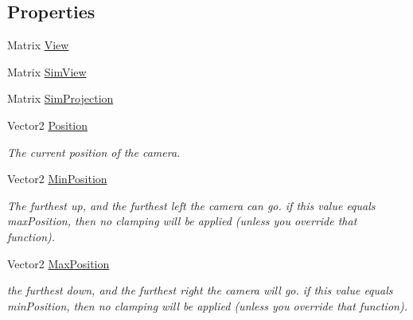 \subsection*{Properties}
\begin{DoxyCompactItemize}
\item 
Matrix \hyperlink{classgearit_1_1xna_1_1_camera2_d_ab2fbc971de185e14e0675169c2067cf4}{View}
\item 
Matrix \hyperlink{classgearit_1_1xna_1_1_camera2_d_a26119c8c8951ad9e7a64b47f211b1e32}{Sim\+View}
\item 
Matrix \hyperlink{classgearit_1_1xna_1_1_camera2_d_a09dac4561fd789c364d243776fde4921}{Sim\+Projection}
\item 
Vector2 \hyperlink{classgearit_1_1xna_1_1_camera2_d_a521385c0e06f30380cf90da21d2807b2}{Position}
\begin{DoxyCompactList}\small\item\em The current position of the camera. \end{DoxyCompactList}\item 
Vector2 \hyperlink{classgearit_1_1xna_1_1_camera2_d_aef67974a5b726a05b395b372099fcdc9}{Min\+Position}
\begin{DoxyCompactList}\small\item\em The furthest up, and the furthest left the camera can go. if this value equals max\+Position, then no clamping will be applied (unless you override that function). \end{DoxyCompactList}\item 
Vector2 \hyperlink{classgearit_1_1xna_1_1_camera2_d_a79ff90e265356a7b38babf6315464cca}{Max\+Position}
\begin{DoxyCompactList}\small\item\em the furthest down, and the furthest right the camera will go. if this value equals min\+Position, then no clamping will be applied (unless you override that function). \end{DoxyCompactList}\item 

\end{DoxyCompactItemize}

